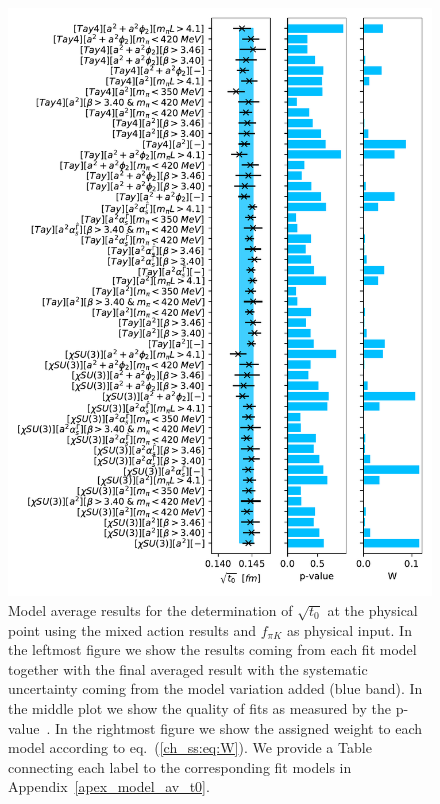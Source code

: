 \begin{figure}
    \centering
    \includegraphics[width=1.\textwidth]{./cap5/figs/BMA_tm.pdf}
    \caption{Model average results for the determination of $\sqrt{t_0}$ at the physical point using the mixed action results and $f_{\pi K}$ as physical input. In the leftmost figure we show the results coming from each fit model together with the final averaged result with the systematic uncertainty coming from the model variation added (blue band). In the middle plot we show the quality of fits as measured by the p-value~\citep{Bruno:2022mfy}. In the rightmost figure we show the assigned weight to each model according to eq.~(\ref{ch_ss:eq:W}). We provide a Table connecting each label to the corresponding fit models in Appendix~\ref{apex_model_av_t0}.}
    \label{ch_ss:fig:BMA_tm}
\end{figure}

